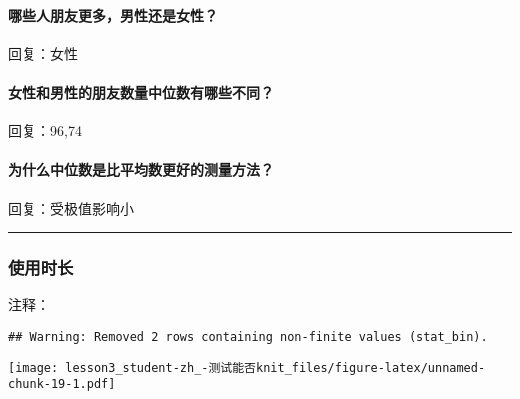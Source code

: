 \documentclass[]{article}
\newenvironment{Shaded}{\begin{snugshade}}{\end{snugshade}}
\newcommand{\DataTypeTok}[1]{\textcolor[rgb]{0.13,0.29,0.53}{#1}}
\newcommand{\DecValTok}[1]{\textcolor[rgb]{0.00,0.00,0.81}{#1}}
\newcommand{\KeywordTok}[1]{\textcolor[rgb]{0.13,0.29,0.53}{\textbf{#1}}}
\newcommand{\NormalTok}[1]{#1}
\newcommand{\OperatorTok}[1]{\textcolor[rgb]{0.81,0.36,0.00}{\textbf{#1}}}
\newcommand{\StringTok}[1]{\textcolor[rgb]{0.31,0.60,0.02}{#1}}
\let\oldparagraph\paragraph
\renewcommand{\paragraph}[1]{\oldparagraph{#1}\mbox{}}
\begin{document}
\paragraph{哪些人朋友更多，男性还是女性？}

回复：女性

\paragraph{女性和男性的朋友数量中位数有哪些不同？}

回复：96,74

\paragraph{为什么中位数是比平均数更好的测量方法？}

回复：受极值影响小

\begin{center}\rule{0.5\linewidth}{\linethickness}\end{center}

\subsubsection{使用时长}

注释：

\begin{Shaded}
\end{Shaded}

\begin{verbatim}
## Warning: Removed 2 rows containing non-finite values (stat_bin).
\end{verbatim}

\texttt{[image: lesson3\_student-zh\_-测试能否knit\_files/figure-latex/unnamed-chunk-19-1.pdf]}

\begin{Shaded}
\end{Shaded}
\end{document}
